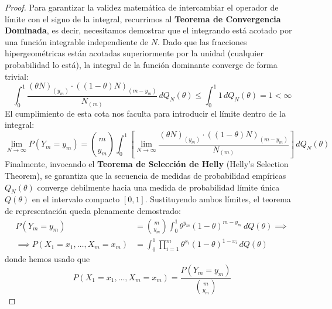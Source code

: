\begin{teo}
\begin{proof}
    \noindent
    Para garantizar la validez matemática de intercambiar el operador de límite con el signo de la integral, recurrimos al \textbf{Teorema de Convergencia Dominada}, es decir, necesitamos demostrar que el integrando está acotado por una función integrable independiente de $N$. Dado que las fracciones hipergeométricas están acotadas superiormente por la unidad (cualquier probabilidad lo está), la integral de la función dominante converge de forma trivial:
    \begin{equation*}
        \int_{0}^{1} \frac{(\theta N)_{(y_m)} \cdot ((1 - \theta) N)_{(m - y_m)}}{N_{(m)}} \, dQ_N(\theta) \leq \int_{0}^{1} 1 \, dQ_N(\theta) = 1 < \infty
    \end{equation*}
    El cumplimiento de esta cota nos faculta para introducir el límite dentro de la integral:
    \begin{equation*}
        \lim_{N \to \infty} P(Y_m = y_m) = \binom{m}{y_m} \int_{0}^{1} \left[ \lim_{N \to \infty} \frac{(\theta N)_{(y_m)} \cdot ((1 - \theta) N)_{(m - y_m)}}{N_{(m)}} \right] \, dQ_N(\theta)
    \end{equation*}
    Finalmente, invocando el \textbf{Teorema de Selección de Helly} (Helly's Selection Theorem), se garantiza que la secuencia de medidas de probabilidad empíricas $Q_N(\theta)$ converge debilmente hacia una medida de probabilidad límite única $Q(\theta)$ en el intervalo compacto $[0, 1]$. Sustituyendo ambos límites, el teorema de representación queda plenamente demostrado:
    \begin{align*}
        P(Y_m = y_m) &= \binom{m}{y_m} \int_{0}^{1} \theta^{y_m} (1 - \theta)^{m - y_m} \, dQ(\theta) \implies \\
        \implies P(X_1 = x_1, \dots, X_m = x_m) &= \int_{0}^{1} \prod_{i=1}^{m} \theta^{x_i} (1 - \theta)^{1 - x_i} \, dQ(\theta)
    \end{align*}
    donde hemos usado que
    \begin{equation*}
        P(X_1 = x_1, \dots, X_m = x_m) = \frac{P(Y_m = y_m)}{\binom{m}{y_m}}
    \end{equation*}
\end{proof}
\end{teo}

